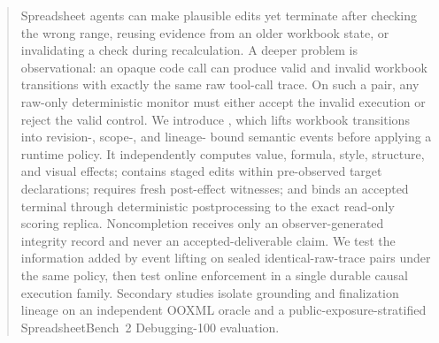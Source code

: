 \begin{abstract}
Spreadsheet agents can make plausible edits yet terminate after checking the
wrong range, reusing evidence from an older workbook state, or invalidating a
check during recalculation. A deeper problem is observational: an opaque code
call can produce valid and invalid workbook transitions with exactly the same
raw tool-call trace. On such a pair, any raw-only deterministic monitor must
either accept the invalid execution or reject the valid control. We introduce
\method, which lifts workbook transitions into revision-, scope-, and lineage-
bound semantic events before applying a runtime policy. It independently
computes value, formula, style, structure, and visual effects; contains staged
edits within pre-observed target declarations; requires fresh post-effect
witnesses; and binds an accepted terminal through deterministic postprocessing
to the exact read-only scoring replica. Noncompletion receives only an
observer-generated integrity record and never an accepted-deliverable claim.
We test the information added by event lifting on sealed identical-raw-trace
pairs under the same policy, then test online enforcement in a single durable
causal execution family. Secondary studies isolate grounding and finalization
lineage on an independent OOXML oracle and a public-exposure-stratified
SpreadsheetBench~2 Debugging-100 evaluation.
\end{abstract}
